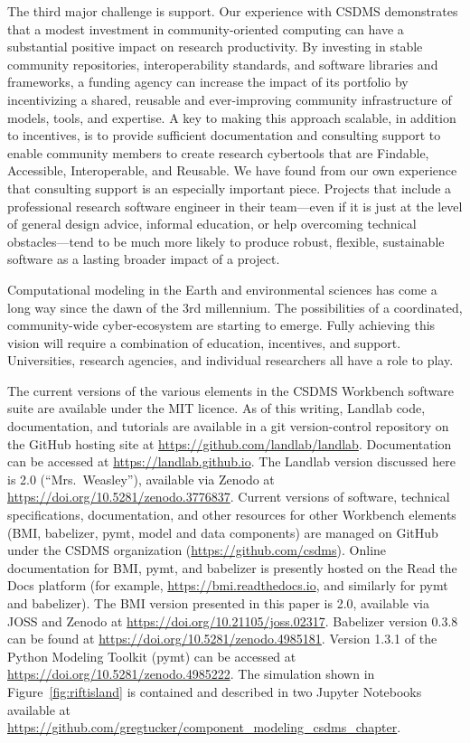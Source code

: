 \documentclass[journal abbreviation, manuscript]{copernicus}
\begin{document}
The third major challenge is support. Our experience with CSDMS demonstrates that a modest investment in community-oriented computing can have a substantial positive impact on research productivity. By investing in stable community repositories, interoperability standards, and software libraries and frameworks, a funding agency can increase the impact of its portfolio by incentivizing a shared, reusable and ever-improving community infrastructure of models, tools, and expertise. A key to making this approach scalable, in addition to incentives, is to provide sufficient documentation and consulting support to enable community members to create research cybertools that are Findable, Accessible, Interoperable, and Reusable. We have found from our own experience that consulting support is an especially important piece. Projects that include a professional research software engineer in their team---even if it is just at the level of general design advice, informal education, or help overcoming technical obstacles---tend to be much more likely to produce robust, flexible, sustainable software as a lasting broader impact of a project.

Computational modeling in the Earth and environmental sciences has come a long way since the dawn of the 3rd millennium. The possibilities of a coordinated, community-wide cyber-ecosystem are starting to emerge. Fully achieving this vision will require a combination of education, incentives, and support. Universities, research agencies, and individual researchers all have a role to play.


\codeavailability

The current versions of the various elements in the CSDMS Workbench software suite are available under the MIT licence. As of this writing, Landlab code, documentation, and tutorials are available in a git version-control repository on the GitHub hosting site at \url{https://github.com/landlab/landlab}. Documentation can be accessed at \url{https://landlab.github.io}. The Landlab version discussed here is 2.0 (``Mrs.\ Weasley''), available via Zenodo at \url{ https://doi.org/10.5281/zenodo.3776837}. Current versions of software, technical specifications, documentation, and other resources for other Workbench elements (BMI, babelizer, pymt, model and data components) are managed on GitHub under the CSDMS organization (\url{https://github.com/csdms}). Online documentation for BMI, pymt, and babelizer is presently hosted on the Read the Docs platform (for example, \url{https://bmi.readthedocs.io}, and similarly for pymt and babelizer). The BMI version presented in this paper is 2.0, available via JOSS and Zenodo at  \url{https://doi.org/10.21105/joss.02317}. Babelizer version 0.3.8 can be found at \url{https://doi.org/10.5281/zenodo.4985181}. Version 1.3.1 of the Python Modeling Toolkit (pymt) can be accessed at \url{ https://doi.org/10.5281/zenodo.4985222}. The simulation shown in Figure~\ref{fig:riftisland} is contained and described in two Jupyter Notebooks available at \url{https://github.com/gregtucker/component_modeling_csdms_chapter}.
\end{document}
